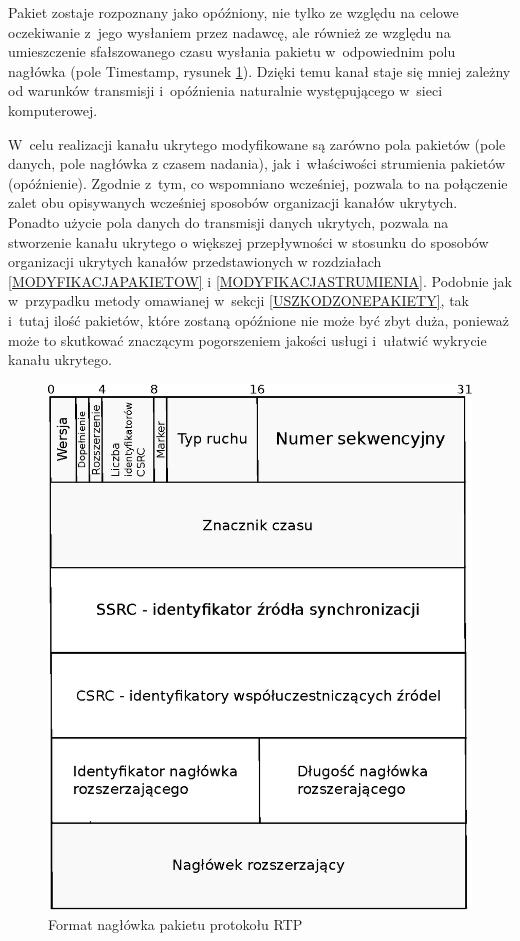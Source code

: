 \documentclass[a4paper, twoside, 12pt]{report}
\begin{document}
        Pakiet zostaje rozpoznany jako opóźniony, nie tylko ze względu na celowe
        oczekiwanie z~jego wysłaniem przez nadawcę, ale również ze względu
        na umieszczenie sfałszowanego czasu wysłania pakietu w~odpowiednim
        polu nagłówka (pole Timestamp, rysunek \ref{RTPHEADER}). Dzięki temu kanał staje się mniej zależny
        od warunków transmisji i~opóźnienia naturalnie występującego w~sieci komputerowej.

        W~celu realizacji kanału ukrytego modyfikowane są zarówno pola pakietów (pole danych,
        pole nagłówka z czasem nadania), jak i~właściwości strumienia pakietów (opóźnienie).
        Zgodnie z~tym, co wspomniano wcześniej, pozwala to na połączenie zalet obu opisywanych
        wcześniej sposobów organizacji kanałów ukrytych. Ponadto użycie pola danych
        do transmisji danych ukrytych, pozwala na stworzenie kanału ukrytego o
        większej przepływności w stosunku do sposobów organizacji ukrytych kanałów
        przedstawionych w rozdziałach \ref{MODYFIKACJAPAKIETOW} i \ref{MODYFIKACJASTRUMIENIA}.
        Podobnie jak w~przypadku metody omawianej w~sekcji
        \ref{USZKODZONEPAKIETY}, tak i~tutaj ilość pakietów, które zostaną opóźnione
        nie może być zbyt duża, ponieważ może to skutkować znaczącym pogorszeniem
        jakości usługi i~ułatwić wykrycie kanału ukrytego.

        \begin{figure}[h]
                \centering
                \includegraphics[scale=0.8]{rtp_header}
                \caption{Format nagłówka pakietu protokołu RTP}
                \label{RTPHEADER}
        \end{figure}
\end{document}
